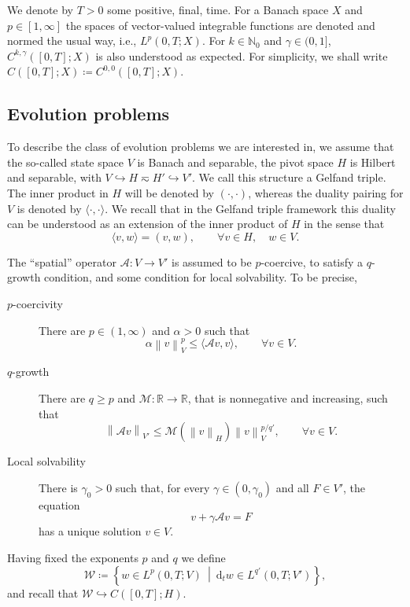 \documentclass{amsart}
\newcommand{\nrm}[1]{\left\| #1 \right\|}
\newcommand{\Real}{\mathbb{R}}
\newcommand{\Natural}{\mathbb{N}}
\newcommand{\mclA}{\mathcal{A}}
\newcommand{\mclW}{\mathcal{W}}
\newcommand{\mclM}{\mathcal{M}}
\theoremstyle{definition}
\newcommand{\diff}{\mathrm{d}}
\newcommand{\AJS}[1]{#1}
\begin{document}
We denote by $T>0$ some positive, final, time. For a Banach space $X$ and $p \in [1,\infty]$ the spaces of vector-valued integrable functions are denoted and normed the usual way, i.e.,
$ L^p(0,T;X)$. For $k \in \Natural_0$ and $\gamma \in (0,1]$, $C^{k,\gamma}([0,T];X)$ is also understood as expected. For simplicity, we shall write $C([0,T];X) \coloneqq C^{0,0}([0,T];X)$.

\subsection{Evolution problems}
To describe the class of evolution problems we are interested in, we assume that the so-called state space $V$ is Banach and separable, the pivot space $H$ is Hilbert and separable, with $V \hookrightarrow H \eqsim H' \hookrightarrow V'$. We call this structure a Gelfand triple. The inner product in $H$ will be denoted by $(\cdot,\cdot)$, whereas the duality pairing for $V$ is denoted by $\langle \cdot, \cdot \rangle$. We recall that in the Gelfand triple framework this duality can be understood as an extension of the inner product of $H$ in the sense that
\[
  \langle v,w \rangle = (v,w), \qquad \forall v \in H, \quad w \in V.
\]

The ``spatial'' operator $\mclA : V \to V'$ is assumed to be $p$-coercive, to satisfy a $q$-growth condition, and some condition for local solvability. To be precise, 
\begin{description}
  \item[$p$-coercivity] There are $p \in (1,\infty)$ and $\alpha >0$ such that
  \begin{equation}
  \label{eq:pcoercive}
    \alpha \nrm{ v }_V^p \leq \langle \mclA v, v \rangle, \qquad \forall v \in V.
  \end{equation}
  
  \item[$q$-growth] There are $q\geq p$ and $\AJS{\mclM} : \Real \to \Real$, that is nonnegative and increasing, such that
  \[
    \nrm{ \mclA v }_{V'} \leq \AJS{\mclM} \left( \nrm{ v }_H \right) \nrm{ v }_V^{p/q'}, \qquad \forall v\in V.
  \]
  
  \item[Local solvability] There is $\gamma_0 >0$ such that, for every $\gamma \in (0,\gamma_0)$ and all $F \in V'$, the equation
  \[
    v + \gamma \mclA v = F
  \]
  has a unique solution $v \in V$.
\end{description}
Having fixed the exponents $p$ and $q$ we define
\[
  \mclW \coloneqq \left\{ w \in L^p(0,T;V) \ \middle| \ \diff_t w \in L^{q'}(0,T;V') \right\},
\]
and recall that $\mclW \hookrightarrow C([0,T];H)$.
\end{document}
